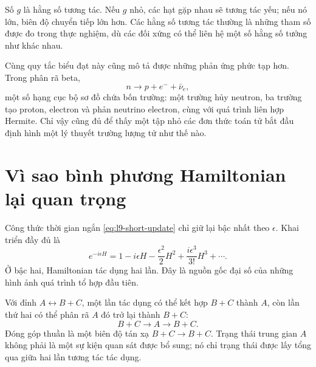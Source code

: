 Số \(g\) là hằng số tương tác. Nếu \(g\) nhỏ, các hạt gặp nhau sẽ tương tác yếu; nếu nó lớn, biên độ chuyển tiếp lớn hơn. Các hằng số tương tác thường là những tham số được đo trong thực nghiệm, dù các đối xứng có thể liên hệ một số hằng số tưởng như khác nhau.

Cùng quy tắc biểu đạt này cũng mô tả được những phản ứng phức tạp hơn. Trong phân rã beta,
\begin{equation}
n\longrightarrow p+e^-+\bar\nu_e,
\end{equation}
một số hạng cục bộ sơ đồ chứa bốn trường: một trường hủy neutron, ba trường tạo proton, electron và phản neutrino electron, cùng với quá trình liên hợp Hermite. Chỉ vậy cũng đủ để thấy một tập nhỏ các đơn thức toán tử bắt đầu định hình một lý thuyết trường lượng tử như thế nào.

\section{Vì sao bình phương Hamiltonian lại quan trọng}

Công thức thời gian ngắn \eqref{eq:l9-short-update} chỉ giữ lại bậc nhất theo \(\epsilon\). Khai triển đầy đủ là
\begin{equation}
e^{-i\epsilon H}
=1-i\epsilon H-\frac{\epsilon^2}{2}H^2
+\frac{i\epsilon^3}{3!}H^3+\cdots.
\label{eq:l9-exponential}
\end{equation}
Ở bậc hai, Hamiltonian tác dụng hai lần. Đây là nguồn gốc đại số của những hình ảnh quá trình tổ hợp đầu tiên.

Với đỉnh \(A\leftrightarrow B+C\), một lần tác dụng có thể kết hợp \(B+C\) thành \(A\), còn lần thứ hai có thể phân rã \(A\) đó trở lại thành \(B+C\):
\begin{equation}
B+C\longrightarrow A\longrightarrow B+C.
\label{eq:l9-bc-scattering}
\end{equation}
Đóng góp thuần là một biên độ tán xạ \(B+C\to B+C\). Trạng thái trung gian \(A\) không phải là một sự kiện quan sát được bổ sung; nó chỉ trạng thái được lấy tổng qua giữa hai lần tương tác tác dụng.

\begin{classroomqa}\end{classroomqa}

